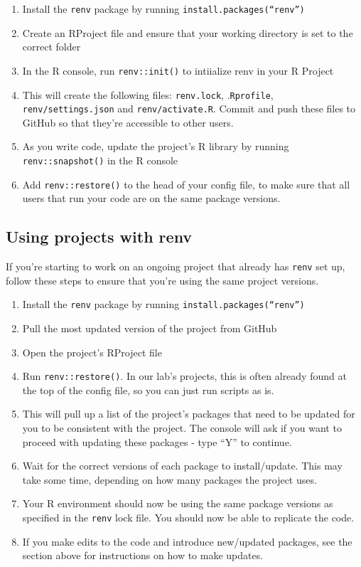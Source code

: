 \documentclass[
]{book}
\providecommand{\tightlist}{%
  \setlength{\itemsep}{0pt}\setlength{\parskip}{0pt}}
\begin{document}
\begin{enumerate}
\def\labelenumi{\arabic{enumi}.}
\tightlist
\item
  Install the \texttt{renv} package by running \texttt{install.packages(“renv”)}
\item
  Create an RProject file and ensure that your working directory is set to the correct folder
\item
  In the R console, run \texttt{renv::init()} to intiialize renv in your R Project
\item
  This will create the following files: \texttt{renv.lock}, .\texttt{Rprofile}, \texttt{renv/settings.json} and \texttt{renv/activate.R}. Commit and push these files to GitHub so that they're accessible to other users.
\item
  As you write code, update the project's R library by running \texttt{renv::snapshot()} in the R console
\item
  Add \texttt{renv::restore()} to the head of your config file, to make sure that all users that run your code are on the same package versions.
\end{enumerate}

\subsection{Using projects with renv}\label{using-projects-with-renv}

If you're starting to work on an ongoing project that already has \texttt{renv} set up, follow these steps to ensure that you're using the same project versions.

\begin{enumerate}
\def\labelenumi{\arabic{enumi}.}
\tightlist
\item
  Install the \texttt{renv} package by running \texttt{install.packages(“renv”)}
\item
  Pull the most updated version of the project from GitHub
\item
  Open the project's RProject file
\item
  Run \texttt{renv::restore()}. In our lab's projects, this is often already found at the top of the config file, so you can just run scripts as is.
\item
  This will pull up a list of the project's packages that need to be updated for you to be consistent with the project. The console will ask if you want to proceed with updating these packages - type ``Y'' to continue.
\item
  Wait for the correct versions of each package to install/update. This may take some time, depending on how many packages the project uses.
\item
  Your R environment should now be using the same package versions as specified in the \texttt{renv} lock file. You should now be able to replicate the code.
\item
  If you make edits to the code and introduce new/updated packages, see the section above for instructions on how to make updates.
\end{enumerate}
\end{document}
